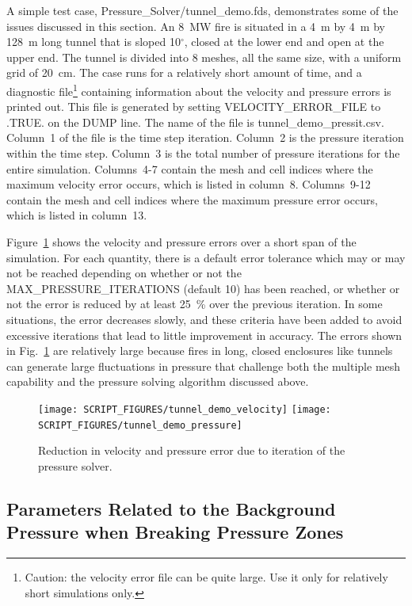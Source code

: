 \documentclass[11pt]{book}
\begin{document}
A simple test case, {\ct Pressure\_Solver/tunnel\_demo.fds}, demonstrates some of the issues discussed in this section. An 8~MW fire is situated in a 4~m by 4~m by 128~m long tunnel that is sloped 10$^\circ$, closed at the lower end and open at the upper end. The tunnel is divided into 8 meshes, all the same size, with a uniform grid of 20~cm. The case runs for a relatively short amount of time, and a diagnostic file\footnote{Caution: the velocity error file can be quite large. Use it only for relatively short simulations only.} containing information about the velocity and pressure errors is printed out. This file is generated by setting {\ct VELOCITY\_ERROR\_FILE} to {\ct .TRUE.} on the {\ct DUMP} line. The name of the file is {\ct tunnel\_demo\_pressit.csv}. Column~1 of the file is the time step iteration. Column~2 is the pressure iteration within the time step. Column~3 is the total number of pressure iterations for the entire simulation. Columns~4-7 contain the mesh and cell indices where the maximum velocity error occurs, which is listed in column~8. Columns~9-12 contain the mesh and cell indices where the maximum pressure error occurs, which is listed in column~13.

Figure~\ref{tunnel_demo_fig} shows the velocity and pressure errors over a short span of the simulation. For each quantity, there is a default error tolerance which may or may not be reached depending on whether or not the {\ct MAX\_PRESSURE\_ITERATIONS} (default 10) has been reached, or whether or not the error is reduced by at least 25~\% over the previous iteration. In some situations, the error decreases slowly, and these criteria have been added to avoid excessive iterations that lead to little improvement in accuracy. The errors shown in Fig.~\ref{tunnel_demo_fig} are relatively large because fires in long, closed enclosures like tunnels can generate large fluctuations in pressure that challenge both the multiple mesh capability and the pressure solving algorithm discussed above.

\begin{figure}[ht]
\texttt{[image: SCRIPT\_FIGURES/tunnel\_demo\_velocity]}
\texttt{[image: SCRIPT\_FIGURES/tunnel\_demo\_pressure]}
\caption[Convergence test for the {\ct tunnel\_demo} test case]{Reduction in velocity and pressure error due to iteration of the pressure solver.}
\label{tunnel_demo_fig}
\end{figure}


\subsection{Parameters Related to the Background Pressure when Breaking Pressure Zones}
\end{document}
